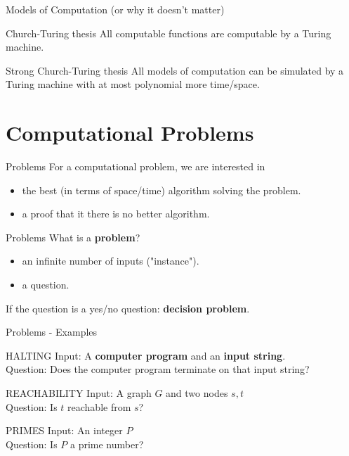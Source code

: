 \documentclass[c]{beamer}
\begin{document}
\begin{frame}{Models of Computation (or why it doesn't matter)}  
	\begin{block}{ Church-Turing thesis }
		All computable functions are computable by a Turing machine.
    \end{block}
    \begin{block}{ Strong Church-Turing thesis }
		All models of computation can be simulated by a Turing machine with at most polynomial more time/space.
    \end{block}
\end{frame}

\section{Computational Problems}
\begin{frame}{Problems}
         For a computational problem, we are interested in
         \begin{itemize}
			\item the best (in terms of space/time) algorithm solving the problem.
			\item a proof that it there is no better algorithm.
		\end{itemize}	  
	
\end{frame}

\begin{frame}{Problems}
        What is a \textbf{problem}?
         \begin{itemize}
			\item an infinite number of inputs ("instance").
			\item a question.
		\end{itemize}	 
		
		If the question is a yes/no question: \textbf{decision problem}. 		
	
\end{frame}

\begin{frame}{Problems - Examples}
    \begin{block}{ HALTING }
		Input: A \textbf{computer program} and an \textbf{input string}.\\
		Question: Does the computer program terminate on that input string?
    \end{block}	
	
	\begin{block}{ REACHABILITY }
		Input: A graph $G$ and two nodes $s,t$\\
		Question: Is $t$ reachable from $s$?
    \end{block}	
    
    \begin{block}{ PRIMES }
		Input: An integer $P$\\
		Question: Is $P$ a prime number?
    \end{block}	
    
\end{frame}
\end{document}
